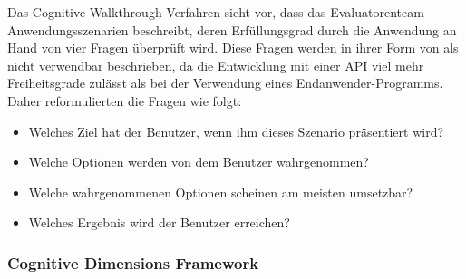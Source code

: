 Das Cognitive-Walkthrough-Verfahren sieht vor, dass das Evaluatorenteam Anwendungsszenarien beschreibt, deren Erfüllungsgrad durch die Anwendung an Hand von vier Fragen überprüft wird. Diese Fragen werden in ihrer Form von \cite{Beaton:2008ix} als nicht verwendbar beschrieben, da die Entwicklung mit einer API viel mehr Freiheitsgrade zulässt als bei der Verwendung eines Endanwender-Programms. Daher reformulierten \cite{Beaton:2008ix} die Fragen wie folgt:

\begin{itemize}
  \item Welches Ziel hat der Benutzer, wenn ihm dieses Szenario präsentiert wird?
  \item Welche Optionen werden von dem Benutzer wahrgenommen?
  \item Welche wahrgenommenen Optionen scheinen am meisten umsetzbar?
  \item Welches Ergebnis wird der Benutzer erreichen?
\end{itemize}



\subsubsection{Cognitive Dimensions Framework}
\label{sec:api-cds}


